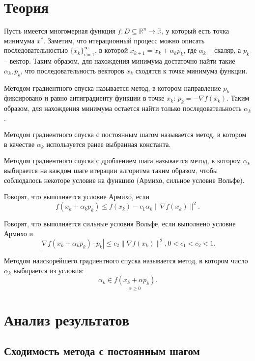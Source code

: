 \documentclass[12pt]{article}
\begin{document}
\section{Теория}
Пусть имеется многомерная функция $f : D \subseteq \mathbb{R}^n \rightarrow \mathbb{R}$, у который есть точка минимума $x^*$. Заметим, что итерационный процесс можно описать последовательностью $\{x_k\}_{i=1}^{\infty}$, в которой $x_{k+1} = x_k + \alpha_k p_k$, где $\alpha_k$ -- скаляр, а $p_k$ -- вектор. Таким образом, для нахождения минимума достаточно найти такие $\alpha_k, p_k$, что последовательность векторов $x_k$ сходятся к точке минимума функции.

Методом градиентного спуска называется метод, в котором направление $p_k$ фиксировано и равно антиградиенту функции в точке $x_k$: $p_k = - \nabla f(x_k)$. Таким образом, для нахождения минимума остается найти только последовательность $\alpha_k$.

Методом градиентного спуска с постоянным шагом называется метод, в котором в качестве $\alpha_k$ используется ранее выбранная константа.

Методом градиентного спуска с дроблением шага называется метод, в котором  $\alpha_k$ выбирается на каждом шаге итерации алгоритма таким образом, чтобы соблюдалось некоторе условие на функцию (Армихо, сильное условие Вольфе).

Говорят, что выполняется условие Армихо, если
\begin{equation*}
    f(x_k + \alpha_k p_k) \leq f(x_k) - c_1 \alpha_k \|\nabla f(x_k)\|^2.
\end{equation*}

Говорят, что выполняется сильные условия Вольфе, если выполнено условие Армихо и
\begin{equation*}
    |\nabla f(x_k + \alpha_k p_k) \cdot p_k| \leq c_2 \|\nabla f(x_k)\|^2, 0 < c_1 < c_2 < 1.
\end{equation*}


Методом наискорейшего градиентного спуска называется метод, в котором число $\alpha_k$ выбирается из условия:
\begin{equation*}
    \alpha_k \in \underset{\alpha \geq 0}{f(x_k + \alpha p_k)}.
\end{equation*}

\section{Анализ результатов}
\subsection{Сходимость метода с постоянным шагом}
\end{document}
